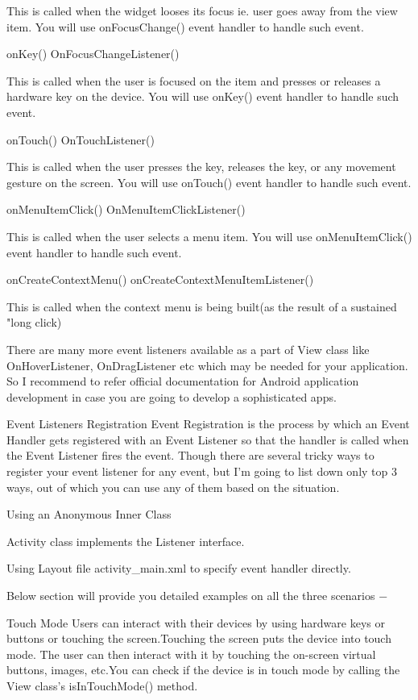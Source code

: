 \documentclass{fisatproject}
\begin{document}
This is called when the widget looses its focus ie. user goes away from the view item. You will use onFocusChange() event handler to handle such event.

onKey()	
OnFocusChangeListener()

This is called when the user is focused on the item and presses or releases a hardware key on the device. You will use onKey() event handler to handle such event.

onTouch()	
OnTouchListener()

This is called when the user presses the key, releases the key, or any movement gesture on the screen. You will use onTouch() event handler to handle such event.

onMenuItemClick()	
OnMenuItemClickListener()

This is called when the user selects a menu item. You will use onMenuItemClick() event handler to handle such event.

onCreateContextMenu()	
onCreateContextMenuItemListener()

This is called when the context menu is being built(as the result of a sustained "long click)

There are many more event listeners available as a part of View class like OnHoverListener, OnDragListener etc which may be needed for your application. So I recommend to refer official documentation for Android application development in case you are going to develop a sophisticated apps.

Event Listeners Registration
Event Registration is the process by which an Event Handler gets registered with an Event Listener so that the handler is called when the Event Listener fires the event. Though there are several tricky ways to register your event listener for any event, but I'm going to list down only top 3 ways, out of which you can use any of them based on the situation.

Using an Anonymous Inner Class

Activity class implements the Listener interface.

Using Layout file activity_main.xml to specify event handler directly.

Below section will provide you detailed examples on all the three scenarios −

Touch Mode
Users can interact with their devices by using hardware keys or buttons or touching the screen.Touching the screen puts the device into touch mode. The user can then interact with it by touching the on-screen virtual buttons, images, etc.You can check if the device is in touch mode by calling the View class’s isInTouchMode() method.
\end{document}
